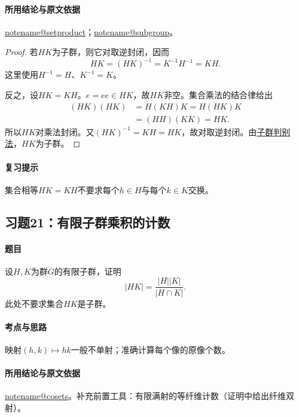 \documentclass[UTF8,a4paper,11pt,fontset=windows]{ctexart}
\makeatletter
\newcommand{\noteref}[1]{\hyperref[note:#1]{\csname notename@#1\endcsname}}
\newcommand{\proofref}[2]{\hyperref[note:#1]{#2}}
\newcommand{\exref}[2]{\hyperref[ex:#1:#2]{第#1章习题#2}}
\makeatother
\begin{document}
\paragraph{所用结论与原文依据}
\noteref{setproduct}；\noteref{subgroup}。


\begin{proof}
若$HK$为子群，则它对取逆封闭，因而
\[
HK=(HK)^{-1}=K^{-1}H^{-1}=KH.
\]
这里使用$H^{-1}=H$、$K^{-1}=K$。

反之，设$HK=KH$。$e=ee\in HK$，故$HK$非空。集合乘法的结合律给出
\begin{align*}
(HK)(HK)&=H(KH)K=H(HK)K\\
&=(HH)(KK)=HK.
\end{align*}
所以$HK$对乘法封闭。又$(HK)^{-1}=KH=HK$，故对取逆封闭。由\proofref{subgroup}{子群判别法}，$HK$为子群。
\end{proof}

\paragraph{复习提示}
集合相等$HK=KH$不要求每个$h\in H$与每个$k\in K$交换。


\subsection{习题21：\texorpdfstring{有限子群乘积的计数}{有限子群乘积的计数}}
\label{ex:1:21}

\paragraph{题目}
设$H,K$为群$G$的有限子群，证明
\[
|HK|=\frac{|H||K|}{|H\cap K|}.
\]
此处不要求集合$HK$是子群。

\paragraph{考点与思路}
映射$(h,k)\mapsto hk$一般不单射；准确计算每个像的原像个数。

\paragraph{所用结论与原文依据}
\noteref{cosets}。补充前置工具：有限满射的等纤维计数（证明中给出纤维双射）。

\end{document}
